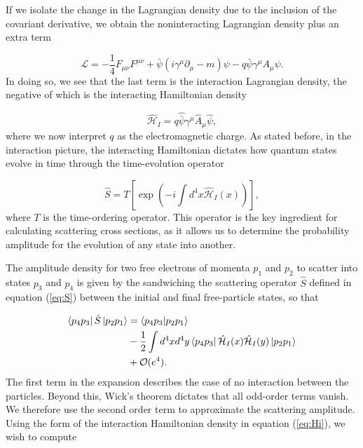 \documentclass{article}
\begin{document}
If we isolate the change in the Lagrangian density due to the inclusion of the covariant derivative, we obtain the noninteracting Lagrangian density plus an extra term

\begin{equation}
    \mathcal{L}
    =
    -\frac{1}{4}F_{\mu\nu}F^{\mu\nu}
    +
    \bar{\psi}(i\gamma^\mu \partial_\mu - m)\psi - q\bar{\psi}\gamma^\mu A_\mu\psi.
\end{equation}
%
In doing so, we see that the last term is the interaction Lagrangian density, the negative of which is the interacting Hamiltonian density

\begin{equation}
    \label{eq:Hi}
    \hat{\mathcal{H}}_I = q\hat{\bar{\psi}}\gamma^\mu \hat{A}_\mu\hat{\psi},
\end{equation}
%
where we now interpret $q$ as the electromagnetic charge.  As stated before, in the interaction picture, the interacting Hamiltonian dictates how quantum states evolve in time through the time-evolution operator

\begin{equation}
    \label{eq:S}
    \hat{S}=T\left[\exp\left(-i\int d^4x\hat{\mathcal{H}}_I(x)\right)\right],
\end{equation}
%
where $T$ is the time-ordering operator.  This operator is the key ingredient for calculating scattering cross sections, as it allows us to determine the probability amplitude for the evolution of any state into another.

 The amplitude density for two free electrons of momenta $p_1$ and $p_2$ to scatter into states $p_3$ and $p_4$ is given by the sandwiching the scattering operator $\hat{S}$ defined in equation (\ref{eq:S}) between the initial and final free-particle states, so that

\begin{equation}
\label{eq:SExpansion}
    \begin{aligned}
    \bra{p_4 p_3}\hat{S}\ket{p_2p_1}
    &=
    \bra{p_4p_3} \ket{p_2p_1}
    \\&-
    \frac{1}{2} \int d^4x d^4y
    \bra{p_4p_3} \hat{\mathcal{H}}_I(x)\hat{\mathcal{H}}_I(y)\ket{p_2p_1}
    \\&+
    \mathcal{O}(e^4).
\end{aligned}
\end{equation}
%
The first term in the expansion describes the case of no interaction between the particles.  Beyond this, Wick's theorem dictates that all odd-order terms vanish.  We therefore use the second order term to approximate the scattering amplitude.
Using the form of the interaction Hamiltonian density in equation (\ref{eq:Hi}), we wish to compute
\end{document}
